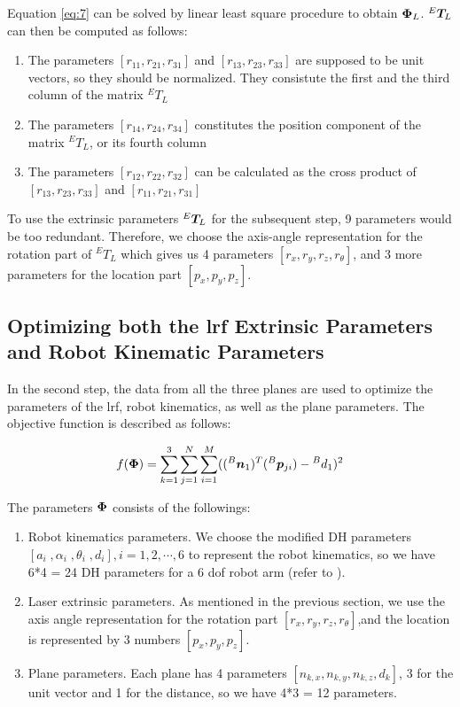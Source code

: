 Equation \eqref{eq:7} can be solved by linear least square procedure to obtain $\vb*{\Phi}_L$. ${^E}\vb*{T}_L$ can then be computed as follows:
\begin{enumerate}
\item The parameters $[r_{11}, r_{21}, r_{31}]$ and $[r_{13}, r_{23}, r_{33}]$ are supposed to be unit vectors, so they should be normalized. They consistute the first and the third column of the matrix ${^E}T_L$
\item The parameters $[r_{14}, r_{24}, r_{34}]$ constitutes the position component of the matrix ${^E}T_L$, or its fourth column
\item The parameters $[r_{12}, r_{22}, r_{32}]$ can be calculated as the cross product of  $[r_{13}, r_{23}, r_{33}]$ and $[r_{11}, r_{21}, r_{31}]$ 
\end{enumerate}

To use the extrinsic parameters ${^E}\vb*{T}_L$ for the subsequent step, 9 parameters would be too redundant. Therefore, we choose the axis-angle representation for the rotation part of ${^E}T_L$ which gives us 4 parameters $[r_x, r_y, r_z, r_{\theta}]$, and 3 more parameters for the location part $[p_x, p_y, p_z]$. 


\subsection{Optimizing both the \ac{lrf} Extrinsic Parameters and Robot Kinematic Parameters}
\label{sec:second_step}
In the second step, the data from all the three planes are used to optimize the parameters of the \ac{lrf}, robot kinematics, as well as the plane parameters. The objective function is described as follows:

\begin{equation}
 f (\vb*{\Phi}) =  \sum_{k=1}^{3} \sum_{j=1}^{N} \sum_{i=1}^{M} (({^B}\vb*{n}_1) ^T ({^B}\vb*{p}_{ji}) - {^B}d_1)^2
\end{equation}

The parameters $\vb*{\Phi}$ consists of the followings:
\begin{enumerate}
\item Robot kinematics parameters. We choose the modified DH parameters \cite{Hayati1985} $[a_i \;, \alpha_i \;,\theta_i \;,d_i], i=1, 2, \cdots ,6$ to represent the robot kinematics, so we have 6*4 = 24 DH parameters for a 6 \ac{dof} robot arm (refer to ). 
\item Laser extrinsic parameters. As mentioned in the previous section, we use the axis angle representation for the rotation part $[r_x, r_y, r_z, r_{\theta}]$,and the location is represented by 3 numbers $[p_x, p_y, p_z]$. 
\item Plane parameters. Each plane has 4 parameters $[n_{k,x}, n_{k,y}, n_{k,z}, d_{k}]$, 3 for the unit vector and 1 for the distance, so we have 4*3 = 12 parameters. 
\end{enumerate}

